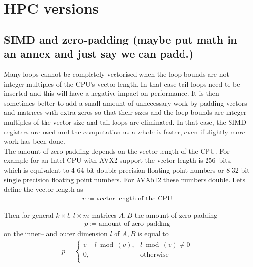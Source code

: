 \documentclass[11pt]{article}
\numberwithin{figure}{section}
\numberwithin{table}{section}
\begin{document}
		\section{HPC versions}
		
		    
		    
			\subsection{SIMD and zero-padding (maybe put math in an annex and just say we can padd.)}
				Many loops cannot be completely vectorised when the loop-bounds are not integer multiples of the CPU's vector length. In that case tail-loops need to be inserted and this will have a negative impact on performance. It is then sometimes better to add a small amount of unnecessary work by padding vectors and matrices with extra zeros so that their sizes and the loop-bounds are integer multiples of the vector size and tail-loops are eliminated. In that case, the SIMD registers are used and the computation as a whole is faster, even if slightly more work has been done.\\
				
				The amount of zero-padding depends on the vector length of the CPU. For example for an Intel CPU with AVX2 support the vector length is 256~bits, which is equivalent to 4 64-bit double precision floating point numbers or 8 32-bit single precision floating point numbers. For AVX512 these numbers double. Lets define the vector length as 
\begin{align}
	v := \text{vector length of the CPU}
\end{align}

Then for general $k\times l$, $l\times m $ matrices $A,B$ the amount of zero-padding 
\begin{align}
	p := \text{amount of zero-padding}
\end{align} 
on the inner-- and outer dimension $l$ of $A,B$ is equal to
\begin{align}
p= \left\{
\begin{array}{ll}
      v-l\bmod(v), & l\bmod(v)\neq0 \\
      0, & \text{otherwise}\\
\end{array} 
\right.	
\end{align}
\end{document}

